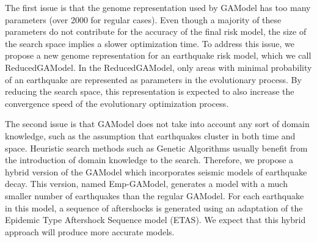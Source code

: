 The first issue is that the genome representation used by GAModel has
too many parameters (over 2000 for regular cases). Even though a
majority of these parameters do not contribute for the accuracy of the
final risk model, the size of the search space implies a slower
optimization time. To address this issue, we propose a new genome
representation for an earthquake risk model, which we call
ReducedGAModel. In the ReducedGAModel, only areas with minimal
probability of an earthquake are represented as parameters in the
evolutionary process. By reducing the search space, this
representation is expected to also increase the convergence speed of
the evolutionary optimization process.

The second issue is that GAModel does not take into account any sort
of domain knowledge, such as the assumption that earthquakes cluster
in both time and space. Heuristic search methods such as Genetic
Algorithms usually benefit from the introduction of domain knowledge
to the search. Therefore, we propose a hybrid version of the GAModel
which incorporates seismic models of earthquake decay. This version,
named Emp-GAModel, generates a model with a much smaller number of
earthquakes than the regular GAModel. For each earthquake in this
model, a sequence of aftershocks is generated using an adaptation of
the Epidemic Type Aftershock Sequence model (ETAS). We expect that
this hybrid approach will produce more accurate models.








